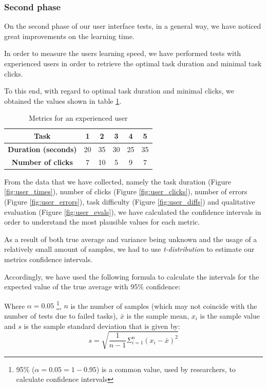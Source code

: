  \subsubsection {Second phase}

On the second phase of our user interface tests, in a general way, we have noticed great improvements on the learning time.

In order to measure the users learning speed, we have performed tests with experienced users in order to retrieve the optimal task duration and minimal task clicks.

To this end, with regard to optimal task duration and minimal clicks, we obtained the values shown in table \ref{table:optimal}.


\begin{table}[H]
\centering
\caption{Metrics for an experienced user}
\label{table:optimal}
\begin{tabular}{|c|c|c|c|c|c|}
\hline
\textbf{Task} & 1 & 2 & 3 & 4 & 5 \\ \hline
\textbf{Duration (seconds)} & 20 & 35 & 30 & 25 & 35 \\ \hline
\textbf{Number of clicks} & 7 & 10 & 5 & 9 & 7 \\ \hline
\end{tabular}
\end{table}


From the data that we have collected, namely the task duration (Figure \ref{fig:user_times}), number of clicks (Figure \ref{fig:user_clicks}), number of errors (Figure \ref{fig:user_errors}), task difficulty (Figure \ref{fig:user_diffs}) and qualitative evaluation (Figure \ref{fig:user_evals}), we have calculated the confidence intervals in order to understand the most plausible values for each metric.

As a result of both true average and variance being unknown and the usage of a relatively small amount of samples, we had to use \emph{t-distribution} to estimate our metrics confidence intervals. 

Accordingly, we have used the following formula to calculate the intervals for the expected value of the true average with 95\% confidence:
\begin{equation}
[\bar{x}-F^{-1}_{t_{(n-1)}}(1-\alpha/2)\times \frac{s}{\sqrt{n}}, \bar{x}+F^{-1}_{t_{(n-1)}}(1-\alpha/2)\times \frac{s}{\sqrt{n}}]
\end{equation}


Where $\alpha=0.05$ \footnote{95\% ($\alpha=0.05=1-0.95$) is a common value, used by researchers, to calculate confidence intervals}, $n$ is the number of samples (which may not coincide with the number of tests due to failed tasks), $\bar{x}$ is the sample mean, $x_i$ is the sample value and $s$ is the sample standard deviation that is given by:
\begin{equation}
s=\sqrt{\frac{1}{n-1}\Sigma^{n}_{i=1}(x_i-\bar{x})^2}
\end{equation}



